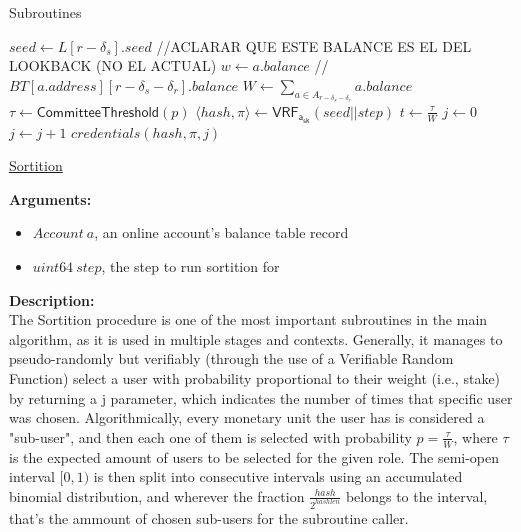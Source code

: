 \documentclass[10pt,a4paper]{article}
\begin{document}
\begin{section}{Subroutines}

\begin{algorithm}[H]
    \begin{algorithmic}[1]
        \State $seed \gets L[r - \delta_s].seed$
        //ACLARAR QUE ESTE BALANCE ES EL DEL LOOKBACK (NO EL ACTUAL)
        \State $w \gets a.balance$ //$BT[a.address][r-\delta_s-\delta_r].balance$
        \State $W \gets \sum_{a \in A_{r-\delta_s-\delta_r}}a.balance$
        \State $\tau \gets \mathsf{CommitteeThreshold}(p)$
        \State $ \langle hash, \pi \rangle \gets \mathsf{VRF_{a_{sk}}}(seed||step)$
        \State $t \gets \frac{\tau}{W}$
        \State $j \gets 0$
        \While{$\frac{hash}{2^{hashlen}}\notin [ \sum_{k=0}^j\mathsf{B}(k;w,t), \sum_{k=0}^{j+1}\mathsf{B}(k;w,t))$}
            \State $j \gets j+1$
        \EndWhile
        \Return $credentials(hash, \pi, j)$
    \EndFunction
    \end{algorithmic}
    \caption{\underline{Sortition}}
\end{algorithm}


\noindent \textbf{Arguments:}
\begin{itemize}
    \item $Account \ a$, an online account's balance table record
    \item $uint64 \ step$, the step to run sortition for
\end{itemize}

\noindent \textbf{Description:}\\
The Sortition procedure is one of the most important subroutines in the main algorithm, as it is 
used in multiple stages and contexts.
Generally, it manages to pseudo-randomly but verifiably (through the use of a Verifiable Random 
Function) select a user with probability proportional
to their weight (i.e., stake) by returning a j parameter, which indicates the number of times that 
specific user was chosen.
Algorithmically, every monetary unit the user has is considered a "sub-user", and then each one 
of them is selected with probability $p = \frac{\tau}{W}$,
where $\tau$ is the expected amount of users to be selected for the given role.
The semi-open interval $[0,1)$ is then split into consecutive intervals using an accumulated 
binomial distribution, and wherever the fraction $\frac{hash}{2^{hashlen}}$
belongs to the interval, that's the ammount of chosen sub-users for the subroutine caller.\\


\end{section}
\end{document}
